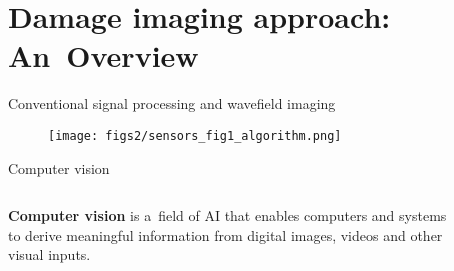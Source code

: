 \documentclass[10pt,aspectratio=169,dvipsnames]{beamer} %
\begin{document}
	\section{Damage imaging approach: An~Overview}	
	\setcounter{subfigure}{0}
	\begin{frame}[t]{Conventional signal processing and wavefield imaging}
		\begin{figure}
			\texttt{[image: figs2/sensors\_fig1\_algorithm.png]}
		\end{figure}
	\end{frame}
	\setcounter{subfigure}{0}
	\setcounter{subfigure}{0}	
	\begin{frame}{Computer vision}
		\begin{columns}[T]
			\begin{column}[c]{0.3\textwidth}
				\justifying
				\alert {\textbf{Computer vision}} is a~field of AI that enables computers and systems to derive meaningful information from digital images, videos and other visual inputs. 
			\end{column}

			\begin{column}[c]{0.7\textwidth}
				\begin{figure}
						\centering
				\end{figure}										
			\end{column}
		\end{columns}	
	\end{frame}
\end{document}
